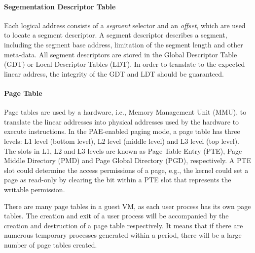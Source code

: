 \paragraph{Segementation Descriptor Table}\label{sec:gdt}
Each logical address consists of a \emph{segment} selector and an \emph{offset}, which are used to locate a segment descriptor.
A segment descriptor describes a segment, including the segment base address, limitation of the segment length and other meta-data.
All segment descriptors are stored in the Global Descriptor Table (GDT) or Local Descriptor Tables (LDT).
In order to translate to the expected linear address, the integrity of the GDT and LDT should be guaranteed.

\paragraph{Page Table}\label{sec:pagetable}
Page tables are used by a hardware, i.e., Memory Management Unit (MMU), to translate the linear addresses into physical addresses used by the hardware to execute instructions.
In the PAE-enabled paging mode, a page table has three levels: L1 level (bottom level), L2 level (middle level) and L3 level (top level).
The slots in L1, L2 and L3 levels are known as Page Table Entry (PTE), Page Middle Directory (PMD) and Page Global Directory (PGD), respectively.
A PTE slot could determine the access permissions of a page, e.g., the kernel could set a page as read-only by clearing the bit within a PTE slot that represents the writable permission.

There are many page tables in a guest VM, as each user process has its own page tables.
The creation and exit of a user process will be accompanied by the creation and destruction of a page table respectively.
It means that if there are numerous temporary processes generated within a period, there will be a large number of page tables created.


